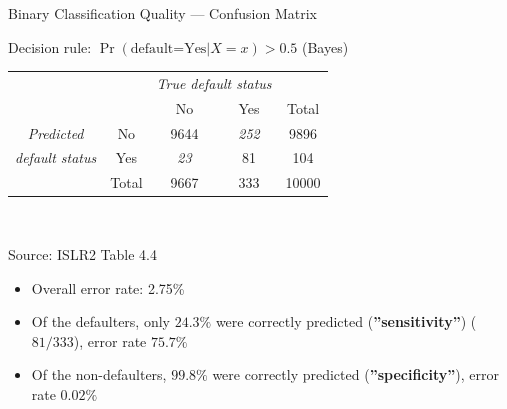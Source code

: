\documentclass[ignorenonframetext,xcolor=x11names]{beamer}
\begin{document}
\begin{frame}[label=full]{Binary Classification Quality --- Confusion Matrix}

\begin{block}{}
\begin{center}
\renewcommand{\arraystretch}{1.25}

Decision rule: $\Pr(\text{default=Yes} | X=x) > 0.5$ (Bayes) \\ \vspace{2mm}
\begin{tabular}{cc|cc|c} \hline
     & & \multicolumn{2}{c|}{\emph{True default status}} \\
     & & No & Yes & Total \\ \hline
\emph{Predicted} & No & 9644 & \emph{252} & 9896 \\ 
\emph{default status} & Yes & \emph{23} & 81 & 104 \\ \hline
     & Total & 9667 & 333 & 10000 \\ \hline
\end{tabular} \\
\end{center}
\scriptsize Source: ISLR2 Table 4.4
\end{block}

\begin{itemize}
  \item Overall error rate: 2.75\%
  \item Of the defaulters, only $24.3\%$ were correctly predicted (\textbf{''sensitivity''}) ($81/333$), error rate $75.7\%$
  \item Of the non-defaulters, $99.8\%$ were correctly predicted (\textbf{''specificity''}), error rate $0.02\%$
\end{itemize}
\end{frame}
\end{document}
